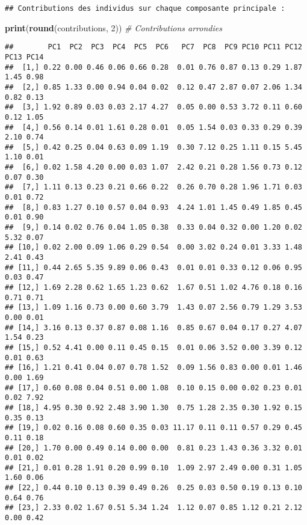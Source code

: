 \documentclass[
]{article}
\newenvironment{Shaded}{\begin{snugshade}}{\end{snugshade}}
\newcommand{\CommentTok}[1]{\textcolor[rgb]{0.56,0.35,0.01}{\textit{#1}}}
\newcommand{\DecValTok}[1]{\textcolor[rgb]{0.00,0.00,0.81}{#1}}
\newcommand{\FunctionTok}[1]{\textcolor[rgb]{0.13,0.29,0.53}{\textbf{#1}}}
\newcommand{\NormalTok}[1]{#1}
\begin{document}
\begin{verbatim}
## Contributions des individus sur chaque composante principale :
\end{verbatim}

\begin{Shaded}
\begin{Highlighting}[]
\FunctionTok{print}\NormalTok{(}\FunctionTok{round}\NormalTok{(contributions, }\DecValTok{2}\NormalTok{))  }\CommentTok{\# Contributions arrondies}
\end{Highlighting}
\end{Shaded}

\begin{verbatim}
##        PC1  PC2  PC3  PC4  PC5  PC6   PC7  PC8  PC9 PC10 PC11 PC12 PC13 PC14
##  [1,] 0.22 0.00 0.46 0.06 0.66 0.28  0.01 0.76 0.87 0.13 0.29 1.87 1.45 0.98
##  [2,] 0.85 1.33 0.00 0.94 0.04 0.02  0.12 0.47 2.87 0.07 2.06 1.34 0.82 0.13
##  [3,] 1.92 0.89 0.03 0.03 2.17 4.27  0.05 0.00 0.53 3.72 0.11 0.60 0.12 1.05
##  [4,] 0.56 0.14 0.01 1.61 0.28 0.01  0.05 1.54 0.03 0.33 0.29 0.39 2.10 0.74
##  [5,] 0.42 0.25 0.04 0.63 0.09 1.19  0.30 7.12 0.25 1.11 0.15 5.45 1.10 0.01
##  [6,] 0.02 1.58 4.20 0.00 0.03 1.07  2.42 0.21 0.28 1.56 0.73 0.12 0.07 0.30
##  [7,] 1.11 0.13 0.23 0.21 0.66 0.22  0.26 0.70 0.28 1.96 1.71 0.03 0.01 0.72
##  [8,] 0.83 1.27 0.10 0.57 0.04 0.93  4.24 1.01 1.45 0.49 1.85 0.45 0.01 0.90
##  [9,] 0.14 0.02 0.76 0.04 1.05 0.38  0.33 0.04 0.32 0.00 1.20 0.02 5.32 0.07
## [10,] 0.02 2.00 0.09 1.06 0.29 0.54  0.00 3.02 0.24 0.01 3.33 1.48 2.41 0.43
## [11,] 0.44 2.65 5.35 9.89 0.06 0.43  0.01 0.01 0.33 0.12 0.06 0.95 0.03 0.47
## [12,] 1.69 2.28 0.62 1.65 1.23 0.62  1.67 0.51 1.02 4.76 0.18 0.16 0.71 0.71
## [13,] 1.09 1.16 0.73 0.00 0.60 3.79  1.43 0.07 2.56 0.79 1.29 3.53 0.00 0.01
## [14,] 3.16 0.13 0.37 0.87 0.08 1.16  0.85 0.67 0.04 0.17 0.27 4.07 1.54 0.23
## [15,] 0.52 4.41 0.00 0.11 0.45 0.15  0.01 0.06 3.52 0.00 3.39 0.12 0.01 0.63
## [16,] 1.21 0.41 0.04 0.07 0.78 1.52  0.09 1.56 0.83 0.00 0.01 1.46 0.00 1.69
## [17,] 0.60 0.08 0.04 0.51 0.00 1.08  0.10 0.15 0.00 0.02 0.23 0.01 0.02 7.92
## [18,] 4.95 0.30 0.92 2.48 3.90 1.30  0.75 1.28 2.35 0.30 1.92 0.15 0.35 0.13
## [19,] 0.02 0.16 0.08 0.60 0.35 0.03 11.17 0.11 0.11 0.57 0.29 0.45 0.11 0.18
## [20,] 1.70 0.00 0.49 0.14 0.00 0.00  0.81 0.23 1.43 0.36 3.32 0.01 0.01 0.02
## [21,] 0.01 0.28 1.91 0.20 0.99 0.10  1.09 2.97 2.49 0.00 0.31 1.05 1.60 0.06
## [22,] 0.44 0.10 0.13 0.39 0.49 0.26  0.25 0.03 0.50 0.19 0.13 0.10 0.64 0.76
## [23,] 2.33 0.02 1.67 0.51 5.34 1.24  1.12 0.07 0.85 1.12 0.21 2.12 0.00 0.42

\end{verbatim}
\end{document}
